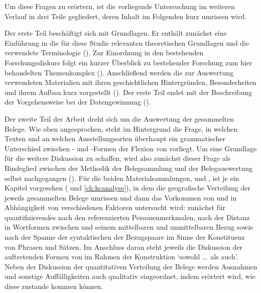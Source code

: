 Um diese Fragen zu erörtern, ist die vorliegende Untersuchung im weiteren
Verlauf in drei Teile gegliedert, deren Inhalt im Folgenden kurz umrissen wird.

Der erste Teil beschäftigt sich mit Grundlagen. Er enthält zunächst eine
Einführung in die für diese Studie relevanten theoretischen Grundlagen und die
verwendete Terminologie (). Zur Einordnung in den
bestehenden Forschungsdiskurs folgt ein kurzer Überblick zu bestehender
Forschung zum hier behandelten Themenkomplex
(). Anschließend werden die zur Auswertung
verwendeten Materialien mit ihren geschichtlichen Hintergründen, Besonderheiten
und ihrem Aufbau kurz vorgestellt (). Der erste Teil
endet mit der Beschreibung der Vorgehensweise bei der Datengewinnung
().

Der zweite Teil der Arbeit dreht sich um die Auswertung der gesammelten Belege.
Wie oben angesprochen, steht im Hintergrund die Frage, in welchen Texten und an
welchen Ausstellungs\-orten überhaupt ein grammatischer Unterschied zwischen
- und -Formen der Flexion von  vorliegt. Um eine
Grundlage für die weitere Diskussion zu schaffen, wird also zunächst dieser
Frage als Bindeglied zwischen der Methodik der Belegsammlung und der
Belegauswertung selbst nachgegangen (). Für die beiden
Materialsammlungen, \CAO{} und \KC{}, ist je ein Kapitel vorgesehen
( und \ref{ch:kcanalyse}), in dem die geografische
Verteilung der jeweils gesammelten Belege
umrissen und dann das Vorkommen von  und in
Abhängigkeit von verschiedenen Faktoren untersucht wird: zunächst für
quantifizierendes  nach den referenzierten
Personenmerkmalen, nach der Distanz in
Wortformen zwischen  und seinem mittelbaren und
unmittelbaren Bezug sowie nach der Spanne der
syntaktischen  der Bezugspaare im Sinne der Konstituenz von Phrasen
und Sätzen. Im Anschluss daran steht jeweils die Diskussion der auftretenden
Formen von  im Rahmen der Konstruktion 
`sowohl \dots\ als auch'. Neben der Diskussion der quantitativen Verteilung der
Belege werden Ausnahmen und sonstige Auffälligkeiten auch
qualitativ eingeordnet, indem erörtert wird, wie diese zustande kommen können.

